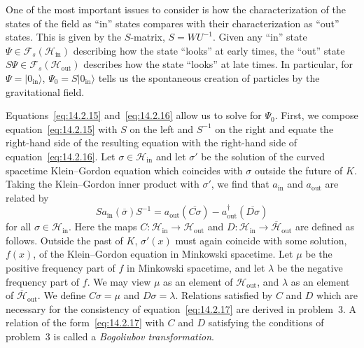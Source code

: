 One of the most important issues to consider is how the characterization of the
states of the field as ``in'' states compares with their characterization as ``out''
states. This is given by the \(S\)-matrix, \(S=WU^{-1}\). Given any ``in'' state
\(\Psi\in\mathcal F_s(\mathcal H_{\mathrm{in}})\) describing how the state
``looks'' at early times, the ``out'' state
\(S\Psi\in\mathcal F_s(\mathcal H_{\mathrm{out}})\) describes how the state
``looks'' at late times. In particular, for \(\Psi=\lvert0_{\mathrm{in}}\rangle\),
\(\Psi_0=S\lvert0_{\mathrm{in}}\rangle\) tells us the spontaneous creation of
particles by the gravitational field.

Equations~\eqref{eq:14.2.15} and~\eqref{eq:14.2.16} allow us to solve for
\(\Psi_0\). First, we compose equation~\eqref{eq:14.2.15} with \(S\) on the left
and \(S^{-1}\) on the right and equate the right-hand side of the resulting equation
with the right-hand side of equation~\eqref{eq:14.2.16}. Let
\(\sigma\in\mathcal H_{\mathrm{in}}\) and let \(\sigma'\) be the solution of the
curved spacetime Klein--Gordon equation which coincides with \(\sigma\) outside the
future of \(K\). Taking the Klein--Gordon inner product with \(\sigma'\), we find
that \(a_{\mathrm{in}}\) and \(a_{\mathrm{out}}\) are related by
\begin{equation}
  Sa_{\mathrm{in}}(\overline\sigma)S^{-1}
  =a_{\mathrm{out}}(\overline{C\sigma})
   -a_{\mathrm{out}}^\dagger(\overline{D\sigma})
  \tag{14.2.17}\label{eq:14.2.17}
\end{equation}
for all \(\sigma\in\mathcal H_{\mathrm{in}}\). Here the maps
\(C:\mathcal H_{\mathrm{in}}\longrightarrow\mathcal H_{\mathrm{out}}\) and
\(D:\mathcal H_{\mathrm{in}}\longrightarrow\overline{\mathcal H}_{\mathrm{out}}\)
are defined as follows. Outside the past of \(K\), \(\sigma'(x)\) must again
coincide with some solution, \(f(x)\), of the Klein--Gordon equation in Minkowski
spacetime. Let \(\mu\) be the positive frequency part of \(f\) in Minkowski
spacetime, and let \(\lambda\) be the negative frequency part of \(f\). We may view
\(\mu\) as an element of \(\mathcal H_{\mathrm{out}}\), and \(\lambda\) as an
element of \(\overline{\mathcal H}_{\mathrm{out}}\). We define \(C\sigma=\mu\)
and \(D\sigma=\lambda\). Relations satisfied by \(C\) and \(D\) which are
necessary for the consistency of equation~\eqref{eq:14.2.17} are derived in
problem~3. A relation of the form~\eqref{eq:14.2.17} with \(C\) and \(D\)
satisfying the conditions of problem~3 is called a \emph{Bogoliubov transformation}.

